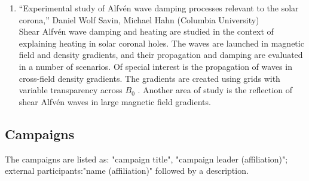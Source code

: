 \documentclass[11pt]{article}
\begin{document}
\begin{enumerate}
\item ``Experimental study of Alfv\'{e}n wave damping processes
  relevant to the solar corona,'' Daniel Wolf Savin, Michael Hahn
  (Columbia University) \\ Shear
  Alfv\'{e}n wave damping and heating are studied in the context
  of explaining heating in solar coronal holes. The waves are
  launched in magnetic field and density gradients, and their
  propagation and  damping are evaluated in a number
  of scenarios. Of special interest is the propagation of waves in
  cross-field density gradients. The gradients are created using
  grids with variable transparency across $B_{0}$ . Another area of
  study is the reflection of shear Alfv\'{e}n waves in large
  magnetic field gradients.




\end{enumerate}



\subsection{Campaigns}
The campaigns are listed as: "campaign title", "campaign leader (affiliation)"; external participants:"name (affiliation)" followed by a description. 
\end{document}
